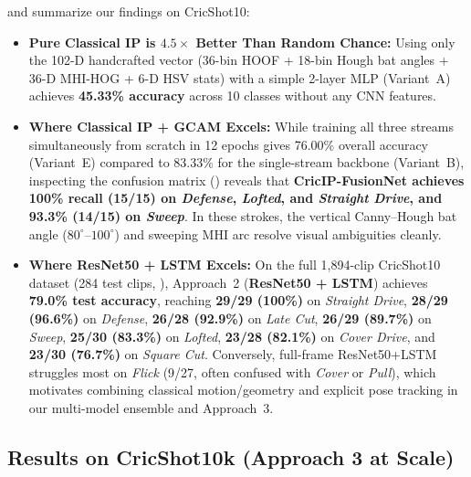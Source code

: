  and  summarize our findings on CricShot10:
\begin{itemize}
    \item \textbf{Pure Classical IP is $4.5\times$ Better Than Random Chance:} Using only the 102-D handcrafted vector (36-bin HOOF + 18-bin Hough bat angles + 36-D MHI-HOG + 6-D HSV stats) with a simple 2-layer MLP (Variant~A) achieves \textbf{45.33\% accuracy} across 10 classes without any CNN features.
    \item \textbf{Where Classical IP + GCAM Excels:} While training all three streams simultaneously from scratch in 12 epochs gives 76.00\% overall accuracy (Variant~E) compared to 83.33\% for the single-stream backbone (Variant~B), inspecting the confusion matrix () reveals that \textbf{CricIP-FusionNet achieves 100\% recall (15/15) on \textit{Defense}, \textit{Lofted}, and \textit{Straight Drive}, and 93.3\% (14/15) on \textit{Sweep}}. In these strokes, the vertical Canny--Hough bat angle ($80^\circ$--$100^\circ$) and sweeping MHI arc resolve visual ambiguities cleanly.
    \item \textbf{Where ResNet50 + LSTM Excels:} On the full 1,894-clip CricShot10 dataset (284 test clips, ), Approach~2 (\textbf{ResNet50 + LSTM}) achieves \textbf{79.0\% test accuracy}, reaching \textbf{29/29 (100\%)} on \textit{Straight Drive}, \textbf{28/29 (96.6\%)} on \textit{Defense}, \textbf{26/28 (92.9\%)} on \textit{Late Cut}, \textbf{26/29 (89.7\%)} on \textit{Sweep}, \textbf{25/30 (83.3\%)} on \textit{Lofted}, \textbf{23/28 (82.1\%)} on \textit{Cover Drive}, and \textbf{23/30 (76.7\%)} on \textit{Square Cut}. Conversely, full-frame ResNet50+LSTM struggles most on \textit{Flick} (9/27, often confused with \textit{Cover} or \textit{Pull}), which motivates combining classical motion/geometry and explicit pose tracking in our multi-model ensemble and Approach~3.
\end{itemize}

\subsection{Results on CricShot10k (Approach 3 at Scale)}


